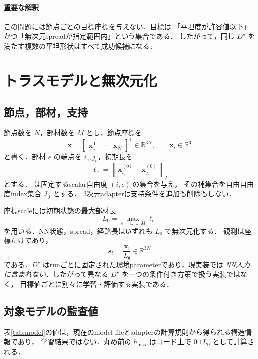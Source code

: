 \documentclass[a4paper,11pt]{ltjsarticle}
\newcommand{\R}{\mathbb{R}}
\newcommand{\norm}[1]{\left\lVert #1\right\rVert}
\newcommand{\Code}[1]{\texttt{\detokenize{#1}}}
\begin{document}
\paragraph{重要な解釈}
この問題には節点ごとの目標座標を与えない．目標は
「平坦度が許容値以下」かつ「無次元spreadが指定範囲内」という集合である．
したがって，同じ $D^\star$ を満たす複数の平坦形状はすべて成功候補になる．

\section{トラスモデルと無次元化}

\subsection{節点，部材，支持}

節点数を $N$，部材数を $M$ とし，節点座標を
\begin{equation}
  \bm{x}=\begin{bmatrix}\bm{x}_1^\mathsf{T}&\cdots&\bm{x}_N^\mathsf{T}\end{bmatrix}^\mathsf{T}
  \in\R^{3N},\qquad \bm{x}_i\in\R^3
\end{equation}
と書く．部材 $e$ の端点を $i_e,j_e$，初期長を
\begin{equation}
  \ell_e=\norm{\bm{x}_{i_e}^{(0)}-\bm{x}_{j_e}^{(0)}}_2
\end{equation}
とする．\Code{fix.dat} は固定するscalar自由度 $(i,c)$ の集合を与え，
その補集合を自由自由度index集合 $\mathcal I_f$ とする．
3次元adapterは支持条件を追加も削除もしない．

座標scaleには初期状態の最大部材長
\begin{equation}
  L_0=\max_{e=1,\ldots,M}\ell_e
\end{equation}
を用いる．NN状態，spread，経路長はいずれも $L_0$ で無次元化する．
観測は座標だけであり，
\begin{equation}
  \bm{s}_t=\frac{\bm{x}_t}{L_0}\in\R^{3N}
\end{equation}
である．$D^\star$ はrunごとに固定された環境parameterであり，現実装では
\emph{NN入力に含まれない}．したがって異なる $D^\star$ を一つの条件付き方策で扱う実装ではなく，
目標値ごとに別々に学習・評価する実装である．

\subsection{対象モデルの監査値}

表\ref{tab:model}の値は，現在のmodel fileとadapterの計算規則から得られる構造情報であり，
学習結果ではない．丸め前の $h_{\max}$ はコード上で $0.1L_0$ として計算される．
\end{document}

